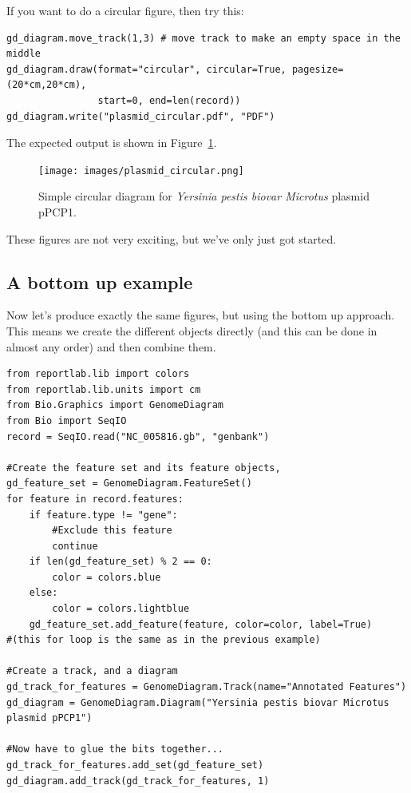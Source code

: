 \documentclass{report}
\begin{document}
If you want to do a circular figure, then try this:

\begin{verbatim}
gd_diagram.move_track(1,3) # move track to make an empty space in the middle
gd_diagram.draw(format="circular", circular=True, pagesize=(20*cm,20*cm),
                start=0, end=len(record))
gd_diagram.write("plasmid_circular.pdf", "PDF")
\end{verbatim}

\begin{htmlonly}

\end{htmlonly}
\begin{latexonly}
The expected output is shown in Figure~\ref{fig:plasmid_circular}.
\begin{figure}[htbp]
\centering
\texttt{[image: images/plasmid\_circular.png]}
\caption{Simple circular diagram for \textit{Yersinia pestis biovar Microtus} plasmid pPCP1.}
\label{fig:plasmid_circular}
\end{figure}
\end{latexonly}
These figures are not very exciting, but we've only just got started.

\subsection{A bottom up example}
Now let's produce exactly the same figures, but using the bottom up approach.
This means we create the different objects directly (and this can be done in
almost any order) and then combine them.

\begin{verbatim}
from reportlab.lib import colors
from reportlab.lib.units import cm
from Bio.Graphics import GenomeDiagram
from Bio import SeqIO
record = SeqIO.read("NC_005816.gb", "genbank")

#Create the feature set and its feature objects,
gd_feature_set = GenomeDiagram.FeatureSet()
for feature in record.features:
    if feature.type != "gene":
        #Exclude this feature
        continue
    if len(gd_feature_set) % 2 == 0:
        color = colors.blue
    else:
        color = colors.lightblue
    gd_feature_set.add_feature(feature, color=color, label=True)
#(this for loop is the same as in the previous example)

#Create a track, and a diagram
gd_track_for_features = GenomeDiagram.Track(name="Annotated Features")
gd_diagram = GenomeDiagram.Diagram("Yersinia pestis biovar Microtus plasmid pPCP1")

#Now have to glue the bits together...
gd_track_for_features.add_set(gd_feature_set)
gd_diagram.add_track(gd_track_for_features, 1)
\end{verbatim}
\end{document}
